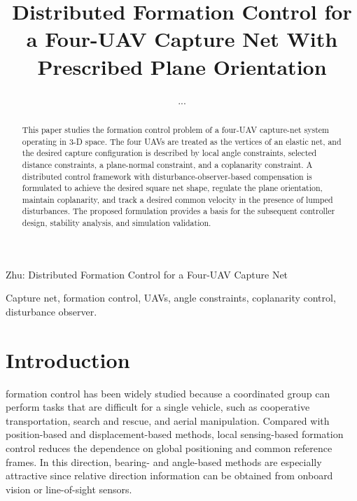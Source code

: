 \documentclass[lettersize,journal]{IEEEtran}
\begin{document}
\title{Distributed Formation Control for a Four-UAV Capture Net With Prescribed Plane Orientation}


\author{...}

%
{Zhu: Distributed Formation Control for a Four-UAV Capture Net}


\maketitle

\begin{abstract}
This paper studies the formation control problem of a four-UAV capture-net system operating in 3-D space. The four UAVs are treated as the vertices of an elastic net, and the desired capture configuration is described by local angle constraints, selected distance constraints, a plane-normal constraint, and a coplanarity constraint. A distributed control framework with disturbance-observer-based compensation is formulated to achieve the desired square net shape, regulate the plane orientation, maintain coplanarity, and track a desired common velocity in the presence of lumped disturbances. The proposed formulation provides a basis for the subsequent controller design, stability analysis, and simulation validation.
\end{abstract}

\begin{IEEEkeywords}
Capture net, formation control, UAVs, angle constraints, coplanarity control, disturbance observer.
\end{IEEEkeywords}

\section{Introduction}
 formation control has been widely studied because a coordinated group can perform tasks that are difficult for a single vehicle, such as cooperative transportation, search and rescue, and aerial manipulation. Compared with position-based and displacement-based methods, local sensing-based formation control reduces the dependence on global positioning and common reference frames. In this direction, bearing- and angle-based methods are especially attractive since relative direction information can be obtained from onboard vision or line-of-sight sensors.
\end{document}
